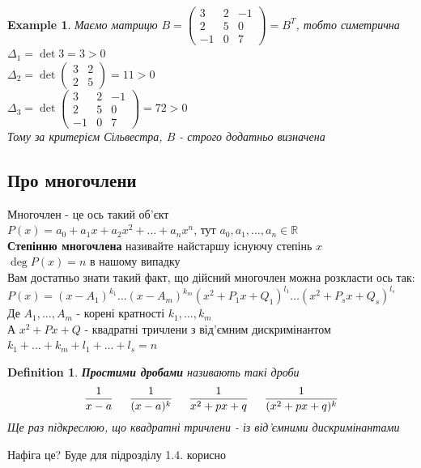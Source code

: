 \documentclass[a4paper, 14pt]{extarticle}
\def\bigline{\vspace{5mm}\\}
\theoremstyle{theoremdd}
\theoremstyle{theoremdd}
\newtheorem{definition}[theorem]{Definition}
\theoremstyle{theoremdd}
\theoremstyle{theoremdd}
\newtheorem{example}[theorem]{Example}
\theoremstyle{theoremdd}
\theoremstyle{theoremdd}
\theoremstyle{theoremdd}
\theoremstyle{theoremdd}
\begin{document}
\begin{example}
Маємо матрицю $B = \begin{pmatrix}
3 & 2 & -1 \\
2 & 5 & 0 \\
-1 & 0 & 7
\end{pmatrix} = B^T$, тобто симетрична\\
$\Delta_1 = \det 3 = 3 > 0$\\
$\Delta_2 = \det \begin{pmatrix}
3 & 2 \\
2 & 5
\end{pmatrix} = 11 > 0$\\
$\Delta_3 = \det \begin{pmatrix}
3 & 2 & -1 \\
2 & 5 & 0 \\
-1 & 0 & 7
\end{pmatrix} = 72 > 0$\\
Тому за критерієм Сільвестра, $B$ - строго додатньо визначена
\end{example}

\subsection*{Про многочлени}
Многочлен - це ось такий об'єкт\\
$P(x) = a_0 + a_1x + a_2x^2 + \dots + a_n x^n$, тут $a_0,a_1,\dots,a_n \in \mathbb{R}$\\
\textbf{Степінню многочлена} називайте найстаршу існуючу степінь $x$\\
$\deg P(x) = n$ в нашому випадку
\bigline
Вам достатньо знати такий факт, що дійсний многочлен можна розкласти ось так:\\
$P(x) = (x-A_1)^{k_1} \dots (x-A_m)^{k_m} (x^2+P_1 x+Q_1)^{l_1} \dots (x^2+P_s x+Q_s)^{l_s}$\\
Де $A_1,\dots,A_m$ - корені кратності $k_1,\dots,k_m$\\
А $x^2+Px+Q$ - квадратні тричлени з від'ємним дискримінантом\\
$k_1 + \dots + k_m + l_1 + \dots + l_s = n$
\begin{definition}
\textbf{Простими дробами} називають такі дроби
\begin{align*}
\dfrac{1}{x-a} \hspace{0.5cm} \dfrac{1}{(x-a)^k} \hspace{0.5cm} \dfrac{1}{x^2+px+q} \hspace{0.5cm} \dfrac{1}{(x^2+px+q)^k}
\end{align*}
Ще раз підкреслюю, що квадратні тричлени - із від'ємними дискримінантами
\end{definition}
Нафіга це? Буде для підрозділу 1.4. корисно
\end{document}
